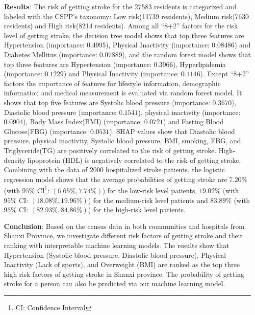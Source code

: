 \documentclass{article}
\begin{document}
\textbf{Results}: The risk of getting stroke for the 27583 residents is categorized and labeled with the CSPP's taxonomy: Low risk(11739 residents), Medium risk(7630 residents) and High risk(8214 residents). Among all ``8+2'' factors for the risk level of getting stroke, the decision tree model shows that top three features are  Hypertension (importance: $0.4995$), Physical Inactivity (importance: $0.08486$) and Diabetes Mellitus (importance: $0.07889$), and the random forest model shows that top three features are Hypertension (importance: $0.3966$), Hyperlipidemia (importance: $0.1229$) and Physical Inactivity (importance: $0.1146$). Except ``8+2'' factors the importance of features for lifestyle information, demographic information and medical measurement is evaluated via random forest model. It shows that top five features are Systolic blood pressure (importance: $0.3670$), Diastolic blood pressure (importance: $0.1541$), physical inactivity (importance: $0.0904$), Body Mass Index(BMI) (importance: $0.0721$) and Fasting Blood Glucose(FBG) (importance: $0.0531$). SHAP values show that Diastolic blood pressure, physical inactivity, Systolic blood pressure, BMI, smoking, FBG, and Triglyceride(TG) are positively correlated to the risk of getting stroke. High-density lipoprotein (HDL) is negatively correlated to the risk of getting stroke. Combining with the data of 2000 hospitalized stroke patients, the logistic regression model shows that the average probabilities of getting stroke are $7.20\%$ (with $95\%$ CI\footnote{CI: Confidence Interval}: $(6.65\%, 7.74\%)$) for the low-risk level patients,  $19.02\%$ (with $95\%$ CI: $(18.08\%, 19.96\%)$) for the medium-risk level patients and $83.89\%$ (with $95\%$ CI: $(82.93\%, 84.86\%)$) for the high-risk level patients.
\begin{comment}
\textbf{Conclusion}: Based on the census data in both communities and hospitals from Shanxi Province, in this paper, we investigate different stroke risk factors and their ranking. It shows that hypertension, physical inactivity (lack of sports), and overweight are ranked as the top three high stroke risk factors in Shanxi. The probability of getting a stroke is also estimated through our interpretable machine learning methods.
\end{comment}

\textbf{Conclusion}: Based on the census data in both communities and hospitals from Shanxi Province,   we investigate different risk factors of getting stroke and their ranking with interpretable machine learning models. The results show that Hypertension (Systolic blood pressure, Diastolic blood pressure), Physical Inactivity (Lack of sports), and Overweight (BMI) are ranked as the top three high risk factors of getting stroke in Shanxi province. The probability of getting stroke for a person can also be predicted via our machine learning model.
\end{document}
